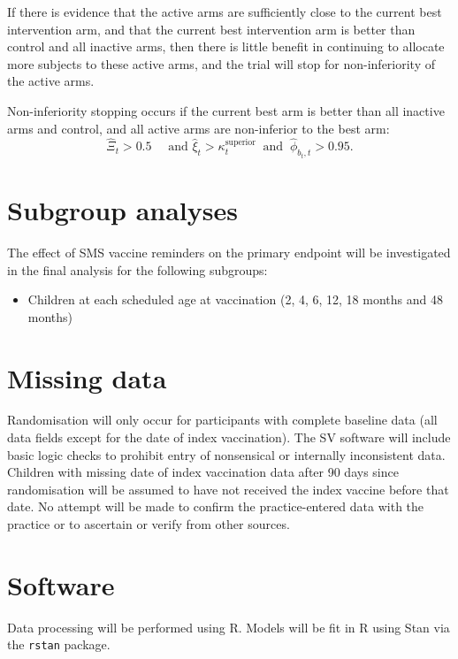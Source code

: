 \documentclass[
  bibliography=totoc]{scrreprt}
\providecommand{\tightlist}{%
  \setlength{\itemsep}{0pt}\setlength{\parskip}{0pt}}
\begin{document}
If there is evidence that the active arms are sufficiently close to the current best intervention arm, and that the current best intervention arm is better than control and all inactive arms, then there is little benefit in continuing to allocate more subjects to these active arms, and the trial will stop for non-inferiority of the active arms.

Non-inferiority stopping occurs if the current best arm is better than all inactive arms and control, and all active arms are non-inferior to the best arm:
\[
\hat\Xi_t >0.5\quad\text{ and } \hat\xi_t>\kappa_t^{\text{superior}}\ \text{ and }\ \hat\phi_{b_t,t}>0.95.
\]

\hypertarget{subgroup-analyses}{%
\section{Subgroup analyses}\label{subgroup-analyses}}

The effect of SMS vaccine reminders on the primary endpoint will be investigated in the final analysis for the following subgroups:

\begin{itemize}
\tightlist
\item
  Children at each scheduled age at vaccination (2, 4, 6, 12, 18 months and 48 months)
\end{itemize}

\hypertarget{missing-data}{%
\section{Missing data}\label{missing-data}}

Randomisation will only occur for participants with complete baseline data (all data fields except for the date of index vaccination).
The SV software will include basic logic checks to prohibit entry of nonsensical or internally inconsistent data.
Children with missing date of index vaccination data after 90 days since randomisation will be assumed to have not received the index vaccine before that date.
No attempt will be made to confirm the practice-entered data with the practice or to ascertain or verify from other sources.

\hypertarget{software}{%
\section{Software}\label{software}}

Data processing will be performed using R.
Models will be fit in R using Stan via the \texttt{rstan} package.
\end{document}

